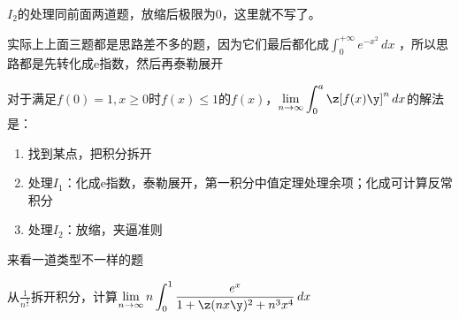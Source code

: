 \begin{remark}
$I_2$的处理同前面两道题，放缩后极限为0，这里就不写了。

实际上上面三题都是思路差不多的题，因为它们最后都化成$\int_{0}^{+\infty} e^{-x^2}\,dx $ ，所以思路都是先转化成e指数，然后再泰勒展开
\end{remark}

\begin{lemma}
对于满足$f(0)=1,x\ge0 $时$f(x)\le1 $的$f(x)$，$\displaystyle \lim_{n\to\infty}\int_{0}^{a} \z[f(x)\y]^n \,dx $的解法是：
\begin{enumerate}
\item 找到某点，把积分拆开
\item 处理$I_1$：化成e指数，泰勒展开，第一积分中值定理处理余项；化成可计算反常积分
\item 处理$I_2$：放缩，夹逼准则
\end{enumerate}
\end{lemma}

来看一道类型不一样的题
\vspace{1mm}
\begin{example}
从$\frac{1}{n^{\frac{4}{5}}}$拆开积分，计算$\displaystyle \lim_{n\to\infty}n\int_{0}^{1}\frac{e^x}{1+\z(nx\y)^2+n^3x^4}\,dx $
\end{example}
\vspace{1mm}

